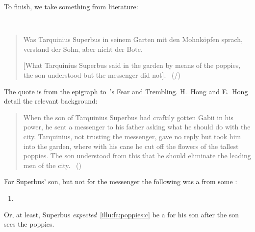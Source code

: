 \begin{note}[Poppies]
  To finish, we take something from literature:

  \begin{scenario}[Poppies]
    \label{illu:fc:poppies}
    \mbox{ }
    \vspace{-\baselineskip}
    \begin{quote}
      Was Tarquinius Superbus in seinem Garten mit den Mohnköpfen sprach, verstand der Sohn, aber nicht der Bote.

      [What Tarquinius Superbus said in the garden by means of the poppies, the son understood but the messenger did not].\newline
      \mbox{ }\hfill\mbox{(\cite[190]{Hamann:1822vp}/\cite[3]{Kierkegaard:1983ta})}
  \end{quote}
  \vspace{-\baselineskip}
  \end{scenario}

  \noindent The quote is from the epigraph to~\citeauthor{Kierkegaard:1983ta}'s \hyperlink{cite.Kierkegaard:1983ta}{Fear and Trembling}.
  \hyperlink{cite.Kierkegaard:1983ta}{H.\ Hong and E.\ Hong} detail the relevant background:

  \begin{quote}
    When the son of Tarquinius Superbus had craftily gotten Gabii in his power, he sent a messenger to his father asking what he should do with the city.
    Tarquinius, not trusting the messenger, gave no reply but took him into the garden, where with his cane he cut off the flowers of the tallest poppies.
    The son understood from this that he should eliminate the leading men of the city.%
    \mbox{ }\hfill\mbox{(\citeyear[339]{Kierkegaard:1983ta})}
  \end{quote}

  \noindent For Superbus' son, but not for the messenger the following was a \fc{} from some \pool{}:

  \begin{enumerate}[label=C\thescenarioCounter., ref=(C\thescenarioCounter)]
  \item
    \label{illu:fc:poppies:c}
  \end{enumerate}

  \noindent Or, at least, Superbus \emph{expected}~\ref{illu:fc:poppies:c} be a \fc{} for his son {\color{blue} after the son sees the poppies}.
\end{note}

